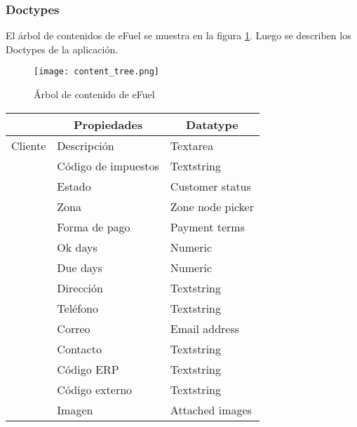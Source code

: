 \subsubsection{Doctypes}
El árbol de contenidos de eFuel se muestra en la figura \ref{fig:content_tree}. Luego se describen los Doctypes de la aplicación.

\begin{figure}[h]
    \texttt{[image: content\_tree.png]}
    \caption{Árbol de contenido de eFuel}
    \label{fig:content_tree}
    \centering
\end{figure}

\begin{center}
    \begin{longtable}{ | p{5em} | l | l | }
        \hline
        \rowcolor{gray!30}
        \multicolumn{1}{|c|}{Doctype} &
        \multicolumn{1}{|c|}{Propiedades} &
        \multicolumn{1}{|c|}{Datatype} \\
        \hline
        \endhead

        \cline{1-1}
        \endfoot

        \hline
        \endfoot

        Cliente
            & Descripción & Textarea \\
            \cline{2-3}
            & Código de impuestos & Textstring \\
            \cline{2-3}
            & Estado & Customer status \\
            \cline{2-3}
            & Zona & Zone node picker \\
            \cline{2-3}
            & Forma de pago & Payment terms \\
            \cline{2-3}
            & Ok days & Numeric \\
            \cline{2-3}
            & Due days & Numeric \\
            \cline{2-3}
            & Dirección & Textstring \\
            \cline{2-3}
            & Teléfono & Textstring \\
            \cline{2-3}
            & Correo & Email address \\
            \cline{2-3}
            & Contacto & Textstring \\
            \cline{2-3}
            & Código ERP & Textstring \\
            \cline{2-3}
            & Código externo & Textstring \\
            \cline{2-3}
            & Imagen & Attached images \\
        \hline


\end{longtable}
\end{center}
